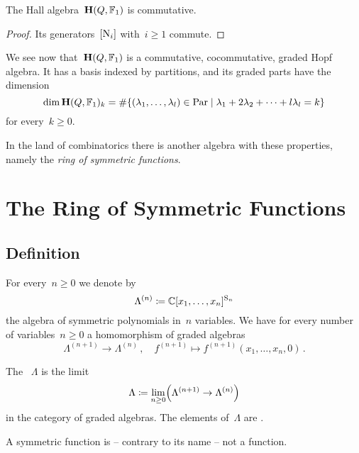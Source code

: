 \documentclass[a4paper,11pt]{scrartcl}
\begin{document}
\begin{corollary}
  The Hall algebra~$\mathbf{H}(Q, \mathbb{F}_1)$ is commutative.
\end{corollary}

\begin{proof}
  Its generators~$[\mathrm{N}_i]$ with~$i \geq 1$ commute.
\end{proof}

We see now that~$\mathbf{H}(Q, \mathbb{F}_1)$ is a commutative, cocommutative, graded Hopf algebra.
It has a basis indexed by partitions, and its graded parts have the dimension
\[
  \dim \Hall(Q, \Finite_1)_k
  =
  \counting
  \{
    (\lambda_1, \dotsc, \lambda_l) \in \Par
  \suchthat
    \lambda_1 + 2 \lambda_2 + \dotsb + l \lambda_l = k
  \}
\]
for every~$k \geq 0$.

In the land of combinatorics there is another algebra with these properties, namely the \emph{ring of symmetric functions}.





\section{The Ring of Symmetric Functions}



\subsection{Definition}

For every~$n \geq 0$ we denote by
\[
  \Lambda^{(n)}
  \coloneqq
  \mathbb{C}[x_1, \dotsc, x_n]^{\mathrm{S}_n}
\]
the algebra of symmetric polynomials in~$n$ variables.
We have for every number of variables~$n \geq 0$ a homomorphism of graded algebras
\[
  \Lambda^{(n+1)} \to \Lambda^{(n)} \,,
  \quad
  f^{(n+1)}
  \mapsto
  f^{(n+1)}(x_1, \dotsc, x_n, 0) \,.
\]

\begin{definition}
  The ~$\Lambda$ is the limit
  \[
    \Lambda
    \coloneqq
    \lim_{n \geq 0}
    \Bigl( \Lambda^{(n+1)} \to \Lambda^{(n)} \Bigr)
  \]
  in the category of graded algebras.
  The elements of~$\Lambda$ are .
\end{definition}

\begin{warning}
  A symmetric function is -- contrary to its name -- not a function.
\end{warning}
\end{document}
